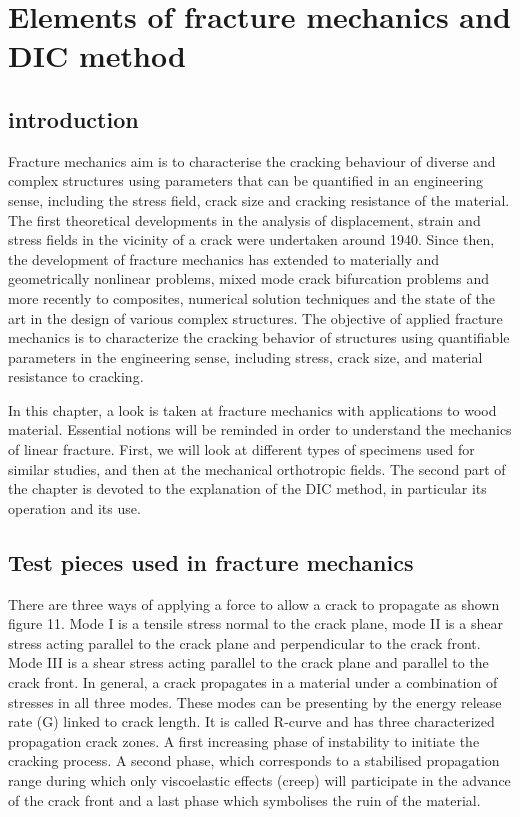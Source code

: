 \chapter{Elements of fracture mechanics and DIC method}
\label{Chapter2}

\section{introduction}

Fracture mechanics aim is to characterise the cracking behaviour of diverse and complex structures using parameters that can be quantified in an engineering sense, including the stress field, crack size and cracking resistance of the material. The first theoretical developments in the analysis of displacement, strain and stress fields in the vicinity of a crack were undertaken around 1940. Since then, the development of fracture mechanics has extended to materially and geometrically nonlinear problems, mixed mode crack bifurcation problems and more recently to composites, numerical solution techniques and the state of the art in the design of various complex structures. The objective of applied fracture mechanics is to characterize the cracking behavior of structures using quantifiable parameters in the engineering sense, including stress, crack size, and material resistance to cracking.

In this chapter, a look is taken at fracture mechanics with applications to wood material. Essential notions will be reminded in order to understand the mechanics of linear fracture. First, we will look at different types of specimens used for similar studies, and then at the mechanical orthotropic fields. The second part of the chapter is devoted to the explanation of the DIC method, in particular its operation and its use.

\section{Test pieces used in fracture mechanics}

There are three ways of applying a force to allow a crack to propagate as shown figure 11. Mode I is a tensile stress normal to the crack plane, mode II is a shear stress acting parallel to the crack plane and perpendicular to the crack front. Mode III is a shear stress acting parallel to the crack plane and parallel to the crack front. In general, a crack propagates in a material under a combination of stresses in all three modes. These modes can be presenting by the energy release rate (G) linked to crack length. It is called R-curve and has three characterized propagation crack zones. A first increasing phase of instability to initiate the cracking process. A second phase, which corresponds to a stabilised propagation range during which only viscoelastic effects (creep) will participate in the advance of the crack front and a last phase which symbolises the ruin of the material.

